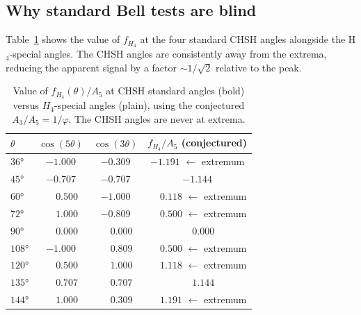 \documentclass[11pt,letterpaper]{article}
\newcommand{\phig}{\varphi}
\begin{document}
\subsection{Why standard Bell tests are blind}

Table~\ref{tab:chsh_values} shows the value of $f_{H_4}$ at the
four standard CHSH angles alongside the H$_4$-special angles.  The
CHSH angles are consistently away from the extrema, reducing the
apparent signal by a factor $\sim 1/\sqrt{2}$ relative to the peak.

\begin{table}[H]
\centering
\caption{Value of $f_{H_4}(\theta)/A_5$ at CHSH standard angles
  (bold) versus $H_4$-special angles (plain), using the conjectured
  $A_3/A_5 = 1/\phig$.  The CHSH angles are never at extrema.}
\label{tab:chsh_values}
\begin{tabular}{@{}lccc@{}}
\toprule
$\theta$ & $\cos(5\theta)$ & $\cos(3\theta)$ &
  $f_{H_4}/A_5$ (conjectured) \\
\midrule
$36°$ & $-1.000$ & $-0.309$ & $-1.191$ \hspace{0.3em}$\leftarrow$ extremum \\
\textbf{$45°$} & $-0.707$ & $-0.707$ & $\mathbf{-1.144}$ \\
$60°$ & $\phantom{-}0.500$ & $-1.000$ & $\phantom{-}0.118$ \hspace{0.3em}$\leftarrow$ extremum \\
$72°$ & $\phantom{-}1.000$ & $-0.809$ & $\phantom{-}0.500$ \hspace{0.3em}$\leftarrow$ extremum \\
\textbf{$90°$} & $\phantom{-}0.000$ & $\phantom{-}0.000$ & $\mathbf{\phantom{-}0.000}$ \\
$108°$ & $-1.000$ & $\phantom{-}0.809$ & $\phantom{-}0.500$ \hspace{0.3em}$\leftarrow$ extremum \\
$120°$ & $\phantom{-}0.500$ & $\phantom{-}1.000$ & $\phantom{-}1.118$ \hspace{0.3em}$\leftarrow$ extremum \\
\textbf{$135°$} & $\phantom{-}0.707$ & $\phantom{-}0.707$ & $\mathbf{\phantom{-}1.144}$ \\
$144°$ & $\phantom{-}1.000$ & $\phantom{-}0.309$ & $\phantom{-}1.191$ \hspace{0.3em}$\leftarrow$ extremum \\
\bottomrule
\end{tabular}
\end{table}
\end{document}
